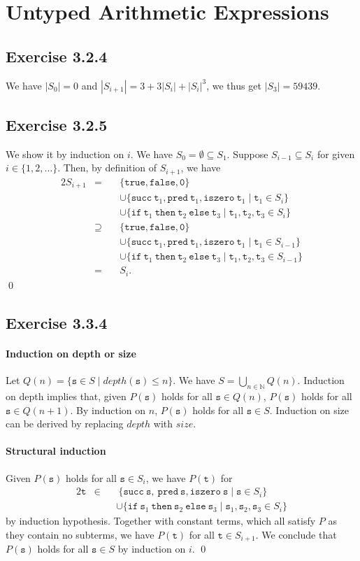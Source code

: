 \documentclass{article}
\newcommand{\code}[1]{\texttt{#1}}
\newcommand{\Ex}[1]{\subsection*{Exercise #1}}
\newcommand{\False}{\code{false}}
\newcommand{\IfThenElse}[3]{\code{if}~#1~\code{then}~#2~\code{else}~#3}
\newcommand{\IsZero}[1]{\code{iszero}~#1}
\newcommand{\N}{\mathbb N}
\newcommand{\Pred}[1]{\code{pred}~#1}
\newcommand{\Succ}[1]{\code{succ}~#1}
\newcommand{\True}{\code{true}}
\newcommand{\Zero}{\code0}
\begin{document}
\section{Untyped Arithmetic Expressions}

\Ex{3.2.4}

We have $|S_0| = 0$ and $|S_{i + 1}| = 3 + 3|S_i| + |S_i|^3$,
  we thus get $|S_3| = 59439$.

\Ex{3.2.5}

We show it by induction on $i$.
We have $S_0 = \emptyset \subseteq S_1$.
Suppose $S_{i - 1} \subseteq S_i$ for given $i \in \{1, 2, \dots\}$.
Then, by definition of $S_{i + 1}$, we have
\begin{alignat*}{2}
  S_{i + 1} &=~
  && \{ \True, \False, \Zero \} \\
  & && \cup \{
    \Succ{\code t_1}, \Pred{\code t_1}, \IsZero{\code t_1}
    \mid \code t_1 \in S_i
  \} \\
  & && \cup \{
    \IfThenElse{\code t_1}{\code t_2}{\code t_3}
    \mid \code t_1, \code t_2, \code t_3 \in S_i
  \} \\
  &\supseteq~
  && \{ \True, \False, \Zero \} \\
  & && \cup \{
    \Succ{\code t_1}, \Pred{\code t_1}, \IsZero{\code t_1}
    \mid \code t_1 \in S_{i - 1}
  \} \\
  & && \cup \{
    \IfThenElse{\code t_1}{\code t_2}{\code t_3}
    \mid \code t_1, \code t_2, \code t_3 \in S_{i - 1}
  \} \\
  &=&& S_i.
\end{alignat*}
\qed

\Ex{3.3.4}

\paragraph{Induction on depth or size}
Let $Q(n) = \{ \code s \in S \mid depth(\code s) \le n \}$.
We have $S = \bigcup_{n\in\N} Q(n)$.
Induction on depth implies that,
  given $P(\code s)$ holds for all $\code s \in Q(n)$,
  $P(\code s)$ holds for all $\code s \in Q(n + 1)$.
By induction on $n$, $P(\code s)$ holds for all $\code s \in S$.
Induction on size can be derived by replacing $depth$ with $size$.

\paragraph{Structural induction}
Given $P(\code s)$ holds for all $\code s \in S_i$,
  we have $P(\code t)$ for
\begin{alignat*}{2}
  \code t &
  \in && ~\{
    \Succ{\code s}, ~\Pred{\code s}, \IsZero{\code s}
    \mid \code s \in S_i
  \} \\
  & &&\cup \{
    \IfThenElse{\code s_1}{\code s_2}{\code s_3}
    \mid \code s_1, \code s_2, \code s_3 \in S_i
  \}
\end{alignat*}
by induction hypothesis.
Together with constant terms, which all satisfy $P$ as they contain no subterms,
  we have $P(\code t)$ for all $\code t \in S_{i + 1}$.
We conclude that $P(\code s)$ holds for all $\code s \in S$ by induction on $i$.
\qed
\end{document}
